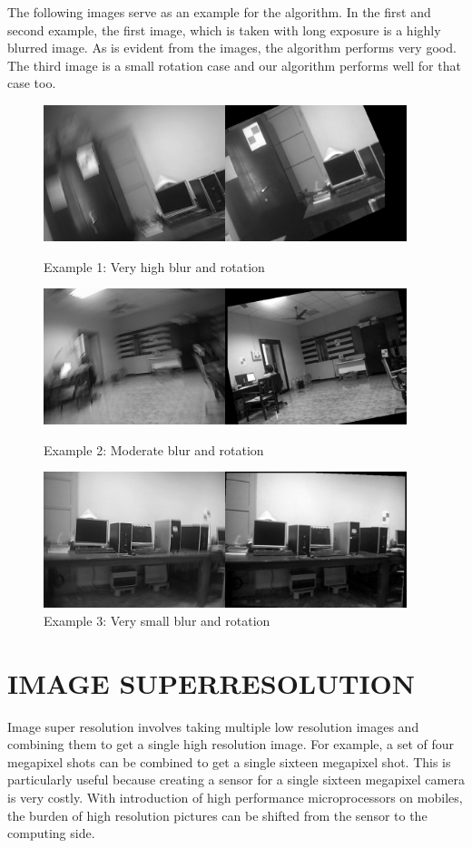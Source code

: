 \documentclass[BTech]{iitmdiss}
\begin{document}
The following images serve as an example for the algorithm. In the first
and second example, the first image, which is taken with long exposure
is a highly blurred image. As is evident from the images, the algorithm
performs very good. The third image is a small rotation case and our
algorithm performs well for that case too.

\begin{figure}[ht]
\begin{center}
\includegraphics[width=300pt]{images/imreg/rotation/eg1/imreg.png}
\caption{Example 1: Very high blur and rotation}
\includegraphics[width=300pt]{images/imreg/rotation/eg2/imreg.png}
\caption{Example 2: Moderate blur and rotation}
\includegraphics[width=300pt]{images/imreg/rotation/eg3/imreg.png}
\caption{Example 3: Very small blur and rotation}
\end{center}
\end{figure}

\pagebreak
\chapter{IMAGE SUPERRESOLUTION}
\label{chap:image_superresolution}
Image super resolution involves taking multiple low resolution images
and combining them to get a single high resolution image. For example,
a set of four megapixel shots can be combined to get a single sixteen
megapixel shot. This is particularly useful because creating a sensor 
for a single sixteen megapixel camera is very costly. With introduction
of high performance microprocessors on mobiles, the burden of high 
resolution pictures can be shifted from the sensor to the computing side.
\end{document}
